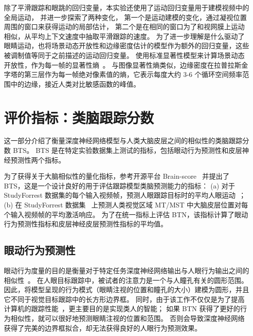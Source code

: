 除了平滑跟踪和眼跳的回归变量，本实验还使用了运动回归变量用于建模视频中的全局运动，
并进一步探索了两种变化，
第一个是运动建模的变化，通过凝视位置周围的窗口来获得运动的局部估计，
第二个是在相同的窗口为了和视网膜上运动相似，从平均上下文速度中抽取平滑跟踪的速度。
为了进一步理解是什么驱动了眼睛运动，也将场景动态开放性和边缘密度估计的模型作为额外的回归变量，这些被调制值等同于之前描述的运动回归变量。
使用标准显著性模型来计算场景动态开放性，作为每一帧的显著性熵~\cite{itti1998a}。
与图像显著性熵类似，边缘密度在拉普拉斯金字塔的第三层作为每一帧绝对像素值的熵，它表示每度大约 3-6 个循环空间频率范围中的边缘，接近人类对比敏感函数的峰值。



\section{评价指标：类脑跟踪分数}
这一部分介绍了衡量深度神经网络模型与人类大脑皮层之间的相似性的类脑跟踪分数 BTS。
BTS 是在特定实验数据集上测试的指标，包括眼动行为预测性和皮层神经预测性两个指标。

为了获得关于大脑相似性的量化指标，参考开源平台 Brain-score~\cite{SchrimpfKubilius2018BrainScore} 并提出了 BTS，这是一个设计良好的用于评估跟踪模型类脑预测能力的指标：
(a) 对于 StudyForrest 数据集的每个输入视频帧，预测人眼跟踪目标时的平均人眼运动~\cite{gaze_forrest}；
(b) 在 StudyForrest 数据集~\cite{gaze_forrest} 上预测人类视觉区域 MT/MST 中大脑皮层位置对每个输入视频帧的平均激活响应。
为了在统一指标上评估 BTN，该指标计算了眼动行为预测性指标和皮层神经皮层预测性指标的平均值。

\subsection{眼动行为预测性}
眼动行为度量的目的是衡量对于特定任务深度神经网络输出与人眼行为输出之间的相似性~\cite{rajalingham2018large}。
在人眼目标跟踪中，被试者的注意力是一个与人瞳孔有关的圆形范围。
因此，将模型呈现的行为模式（眼睛注视的位置和瞳孔的大小）建模为圆形，并且它不同于视觉目标跟踪中的长方形边界框。
同时，由于该工作不仅仅是为了提高计算机的跟踪性能~\cite{schrimpf2020integrative}，更主要目的是实现类人的智能；
如果 BTN 获得了更好的行为相似性，就可以很好地预测眼睛注视的位置和范围。
否则会导致深度神经网络获得了完美的边界框拟合，却无法获得良好的人眼行为预测效果。

